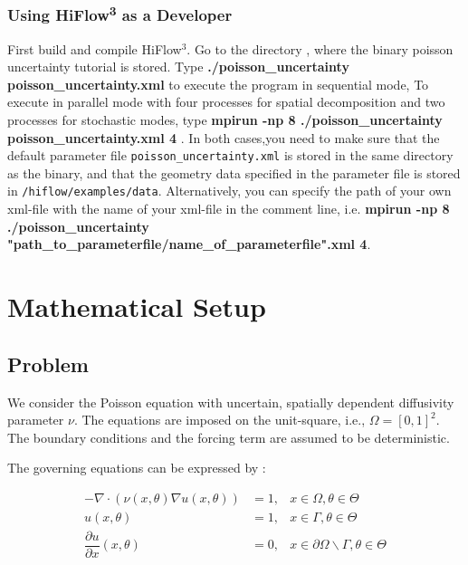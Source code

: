 \documentclass{article}
\newcommand{\HiFlow}{HiFlow\texorpdfstring{\textsuperscript{3} }{3 }}
\begin{document}
\subsubsection{Using \HiFlow as a Developer}

First build and compile  HiFlow$^\text{3}$. Go to the directory , where the binary poisson uncertainty tutorial is stored. Type \textbf{./poisson\_uncertainty poisson\_uncertainty.xml} to execute the program in sequential mode,  To execute in parallel mode with four processes for spatial decomposition and two processes for stochastic modes, type \textbf{mpirun -np 8 ./poisson\_uncertainty poisson\_uncertainty.xml 4 }. In both cases,you need to make sure that the default parameter file \texttt{poisson\_uncertainty.xml} is stored in the same directory as the binary, and that the geometry data specified in the parameter file is stored in \texttt{/hiflow/examples/data}. Alternatively, you can specify the path of your own xml-file with the name of your xml-file in the comment line, i.e. \textbf{mpirun -np 8 ./poisson\_uncertainty "path\_to\_parameterfile/name\_of\_parameterfile".xml 4}.

\pagebreak

\section{Mathematical Setup}
\label{sec:mathSetup}

\subsection{Problem}

We consider the Poisson equation with uncertain, spatially dependent diffusivity parameter $\nu$. The equations are imposed on the unit-square, i.e., $\Omega = [0,1]^2$. The boundary conditions and the forcing term are assumed to be deterministic.

The governing equations can be expressed by :

\begin{align}
\label{eq:poisson_init1}
-\nabla \cdot (\nu(x, \theta) \nabla u(x, \theta)) &= 1, &x \in \Omega, \theta \in \Theta \\
\label{eq:poisson_init2}
u(x, \theta) &= 1, &x \in \Gamma, \theta \in \Theta \\
\label{eq:poisson_init3}
\dfrac{\partial u}{\partial x} (x, \theta) &= 0, &x \in \partial \Omega \backslash \Gamma, \theta \in \Theta
\end{align}
\end{document}
